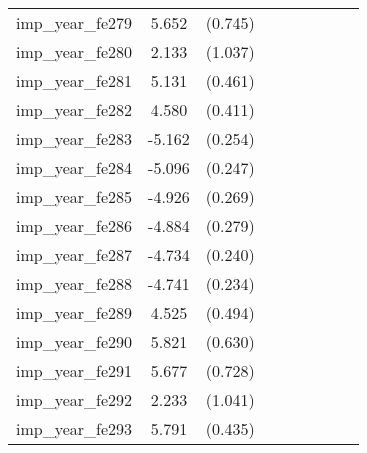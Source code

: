 {\begin{tabular}{l*{4}{cc}}
imp\_year\_fe279&    5.652\sym{***}&  (0.745)&                  &         &                  &         &                  &         \\
imp\_year\_fe280&    2.133\sym{*}  &  (1.037)&                  &         &                  &         &                  &         \\
imp\_year\_fe281&    5.131\sym{***}&  (0.461)&                  &         &                  &         &                  &         \\
imp\_year\_fe282&    4.580\sym{***}&  (0.411)&                  &         &                  &         &                  &         \\
imp\_year\_fe283&   -5.162\sym{***}&  (0.254)&                  &         &                  &         &                  &         \\
imp\_year\_fe284&   -5.096\sym{***}&  (0.247)&                  &         &                  &         &                  &         \\
imp\_year\_fe285&   -4.926\sym{***}&  (0.269)&                  &         &                  &         &                  &         \\
imp\_year\_fe286&   -4.884\sym{***}&  (0.279)&                  &         &                  &         &                  &         \\
imp\_year\_fe287&   -4.734\sym{***}&  (0.240)&                  &         &                  &         &                  &         \\
imp\_year\_fe288&   -4.741\sym{***}&  (0.234)&                  &         &                  &         &                  &         \\
imp\_year\_fe289&    4.525\sym{***}&  (0.494)&                  &         &                  &         &                  &         \\
imp\_year\_fe290&    5.821\sym{***}&  (0.630)&                  &         &                  &         &                  &         \\
imp\_year\_fe291&    5.677\sym{***}&  (0.728)&                  &         &                  &         &                  &         \\
imp\_year\_fe292&    2.233\sym{*}  &  (1.041)&                  &         &                  &         &                  &         \\
imp\_year\_fe293&    5.791\sym{***}&  (0.435)&                  &         &                  &         &                  &         \\

\end{tabular}}

